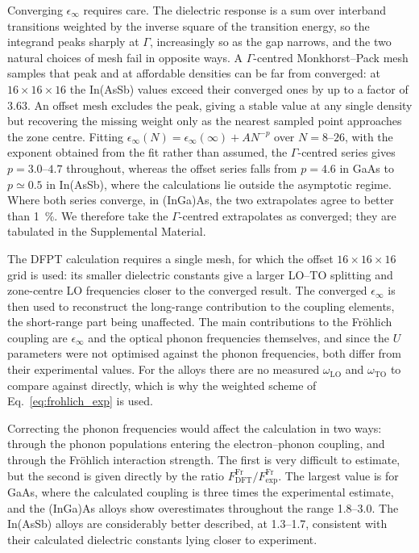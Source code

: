\documentclass[aps,prmaterials,reprint,amsmath,amssymb,superscriptaddress]{revtex4-2}
\begin{document}
Converging $\epsilon_\infty$ requires care. The dielectric response is a sum over interband transitions weighted by the inverse square of the transition energy, so the integrand peaks sharply at $\Gamma$, increasingly so as the gap narrows, and the two natural choices of mesh fail in opposite ways. A $\Gamma$-centred Monkhorst--Pack mesh samples that peak and at affordable densities can be far from converged: at $16\times16\times16$ the In(AsSb) values exceed their converged ones by up to a factor of $3.63$. An offset mesh excludes the peak, giving a stable value at any single density but recovering the missing weight only as the nearest sampled point approaches the zone centre. Fitting $\epsilon_\infty(N)=\epsilon_\infty(\infty)+AN^{-p}$ over $N=\numrange{8}{26}$, with the exponent obtained from the fit rather than assumed, the $\Gamma$-centred series gives $p=\numrange{3.0}{4.7}$ throughout, whereas the offset series falls from $p=4.6$ in GaAs to $p\simeq0.5$ in In(AsSb), where the calculations lie outside the asymptotic regime. Where both series converge, in (InGa)As, the two extrapolates agree to better than \SI{1}{\percent}. We therefore take the $\Gamma$-centred extrapolates as converged; they are tabulated in the Supplemental Material.

The DFPT calculation requires a single mesh, for which the offset $16\times16\times16$ grid is used: its smaller dielectric constants give a larger LO--TO splitting and zone-centre LO frequencies closer to the converged result. The converged $\epsilon_\infty$ is then used to reconstruct the long-range contribution to the coupling elements, the short-range part being unaffected. The main contributions to the Fr{\"o}hlich coupling are $\epsilon_\infty$ and the optical phonon frequencies themselves, and since the $U$ parameters were not optimised against the phonon frequencies, both differ from their experimental values. For the alloys there are no measured $\omega_\text{LO}$ and $\omega_\text{TO}$ to compare against directly, which is why the weighted scheme of Eq.~\ref{eq:frohlich_exp} is used.

Correcting the phonon frequencies would affect the calculation in two ways: through the phonon populations entering the electron--phonon coupling, and through the Fr{\"o}hlich interaction strength. The first is very difficult to estimate, but the second is given directly by the ratio $F^\text{Fr}_\text{DFT}/F^\text{Fr}_\text{exp}$. The largest value is for GaAs, where the calculated coupling is three times the experimental estimate, and the (InGa)As alloys show overestimates throughout the range \numrange{1.8}{3.0}. The In(AsSb) alloys are considerably better described, at \numrange{1.3}{1.7}, consistent with their calculated dielectric constants lying closer to experiment.
\end{document}

